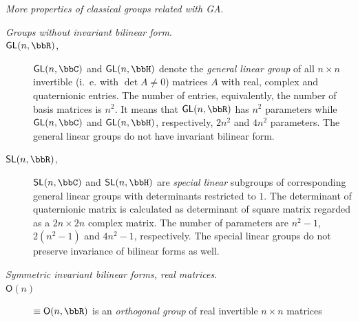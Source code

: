 %
\begin{unit}\textit{More properties of classical groups related with GA}.
\label{groupproperties}
\renewcommand{\descriptionlabel}[1]%
      {\hspace{\labelsep}\textsf{#1}}
\begin{description}%
\item[{\it Groups without invariant bilinear form}.]
\item[$\mathsf{GL}(n,\bbR)$,] $\mathsf{GL}(n,\bbC)$ and
$\mathsf{GL}(n,\bbH)$ denote the \textit{general linear group} of
all $n\times n$ invertible (i.~e. with $\det A \neq 0$) matrices
$A$ with real,  complex and quaternionic entries. The number of
entries, equivalently, the number of basis matrices is $n^2$. It
means that $\mathsf{GL}(n,\bbR)$ has $n^2$ parameters while
$\mathsf{GL}(n,\bbC)$ and $\mathsf{GL}(n,\bbH)$, respectively,
$2n^2$ and $4n^2$ parameters. The general linear groups do not
have invariant bilinear form.
%
\item[$\mathsf{SL}(n,\bbR)$,] $\mathsf{SL}(n,\bbC)$ and
$\mathsf{SL}(n,\bbH)$ are \textit{special linear} subgroups of
corresponding general linear groups with determinants restricted
to $1$. The determinant of quaternionic matrix is calculated as
determinant of square matrix regarded as a $2n\times 2n$ complex
matrix. %
The number of parameters are $n^2-1$, $2(n^2-1)$ and $4n^2-1$,
respectively. The special linear groups do not preserve invariance
of bilinear forms as well.\\[2pt]
%
\item[{\it Symmetric invariant bilinear forms, real matrices}.]
\item[$\mathsf{O}(n)$]$\equiv\mathsf{O}(n,\bbR)$ is an
\textit{orthogonal group} of real invertible $n\times n$ matrices

\end{description}
\end{unit}
